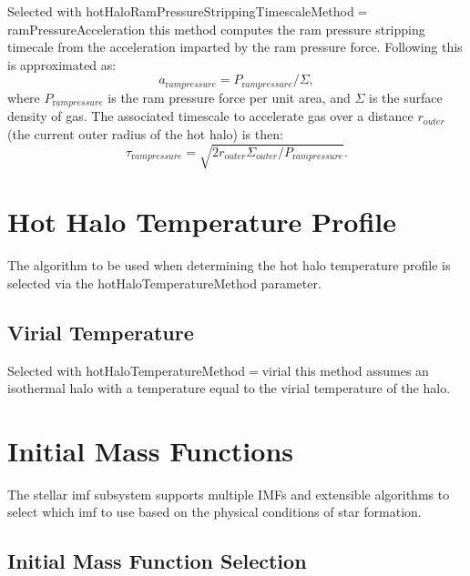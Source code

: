 Selected with {\normalfont \ttfamily hotHaloRamPressureStrippingTimescaleMethod}$=${\normalfont \ttfamily ramPressureAcceleration} this method computes the ram pressure stripping timecale from the acceleration imparted by the ram pressure force. Following \cite{roediger_ram_2007} this is approximated as:
\begin{equation}
 a_{\mathrm ram pressure} = P_{\mathrm ram pressure}/\Sigma,
\end{equation}
where $P_{\mathrm ram pressure}$ is the ram pressure force per unit area, and $\Sigma$ is the surface density of gas. The associated timescale to accelerate gas over a distance $r_{\mathrm outer}$ (the current outer radius of the hot halo) is then:
\begin{equation}
 \tau_{\mathrm ram pressure} = \sqrt{2 r_{\mathrm outer} \Sigma_{\mathrm outer} / P_{\mathrm ram pressure}}.
\end{equation}

\section{Hot Halo Temperature Profile}\label{sec:HotHaloTemperature}

The algorithm to be used when determining the hot halo temperature profile is selected via the {\normalfont \ttfamily hotHaloTemperatureMethod} parameter.

\subsection{Virial Temperature}

Selected with {\normalfont \ttfamily hotHaloTemperatureMethod}$=${\normalfont \ttfamily virial} this method assumes an isothermal halo with a temperature equal to the virial temperature of the halo.

\section{Initial Mass Functions}

The stellar \gls{imf} subsystem supports multiple IMFs and extensible algorithms to select which \gls{imf} to use based on the physical conditions of star formation.

\subsection{Initial Mass Function Selection}

